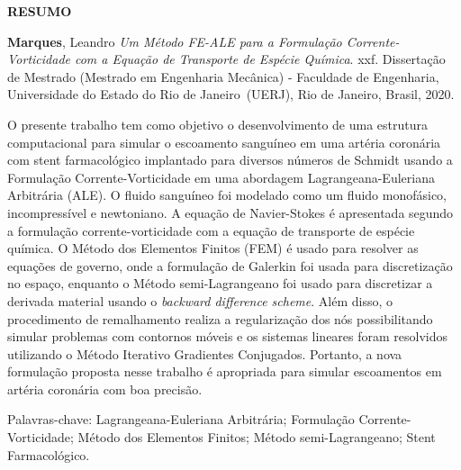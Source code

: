 \begin{center}
\textbf{RESUMO}
\end{center}


$\!$\\

\hspace{-1.3cm}\textbf{Marques}, Leandro \textit{Um Método FE-ALE para a Formulação Corrente-Vorticidade com a Equação de Transporte de Espécie Química}. xxf. Dissertação de Mestrado (Mestrado em Engenharia Mecânica) - Faculdade de Engenharia, Universidade do Estado do Rio de Janeiro~(UERJ), Rio de Janeiro, Brasil, 2020.

\vspace{.2cm}

\indent 
O presente trabalho tem como objetivo o desenvolvimento 
de uma estrutura computacional para simular o escoamento 
sanguíneo em uma artéria coronária com stent farmacológico 
implantado para diversos números de Schmidt usando a Formulação Corrente-Vorticidade em uma 
abordagem Lagrangeana-Euleriana Arbitrária (ALE).
O fluido sanguíneo foi modelado como um fluido monofásico, incompressível e newtoniano.
A equação de Navier-Stokes é apresentada segundo a formulação 
corrente-vorticidade com a equação de transporte de espécie química.
O Método dos Elementos Finitos (FEM) é usado para resolver as equações 
de governo, onde a formulação de Galerkin foi usada para 
discretização no espaço, enquanto o Método semi-Lagrangeano 
foi usado para discretizar a derivada material usando 
o \textit{backward difference scheme}. 
Além disso, o procedimento de remalhamento
realiza a regularização dos nós possibilitando
simular problemas com contornos móveis e os sistemas lineares foram resolvidos utilizando o 
Método Iterativo Gradientes Conjugados.
Portanto, a nova formulação proposta
nesse trabalho é apropriada para
simular escoamentos em artéria coronária com boa precisão.

\vspace{1cm}

\hspace{-1.3cm}Palavras-chave: Lagrangeana-Euleriana Arbitrária; Formulação Corrente-Vorticidade; Método dos Elementos Finitos; Método semi-Lagrangeano; Stent Farmacológico.
